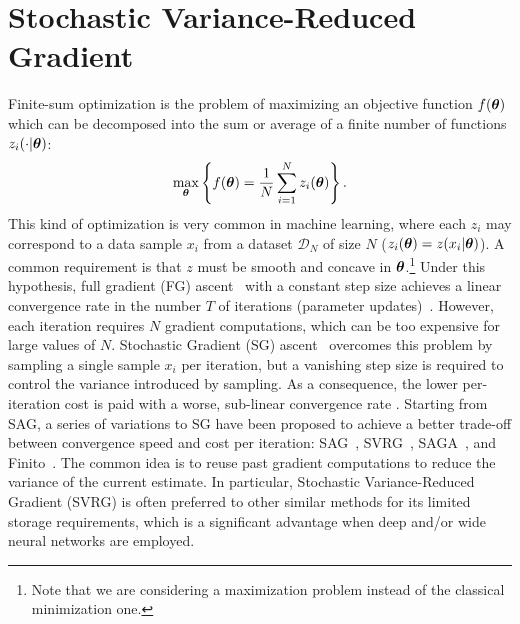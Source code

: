 \section{Stochastic Variance-Reduced Gradient}\label{sec:svrg}
\vspace{-0.05in}
Finite-sum optimization is the problem of maximizing an objective function $f(\boldsymbol{\theta})$ which can be decomposed into the sum or average of a finite number of functions $z_i(\cdot|\boldsymbol{\theta})$:
\begin{align*}
        \max_{\boldsymbol{\theta}} \left\{ f(\boldsymbol{\theta}) = \frac{1}{N}\sum_{i=1}^{N}z_i(\boldsymbol{\theta})\right\}.
\end{align*}
This kind of optimization is very common in machine learning, where each $z_i$ may correspond to a data sample $x_i$ from a dataset $\mathcal{D}_N$ of size $N$ (\ie $z_i(\boldsymbol{\theta}) = z(x_i|\boldsymbol{\theta})$). 
A common requirement is that $z$ must be smooth and concave in $\boldsymbol{\theta}$.\footnote{Note that we are considering a maximization problem instead of the classical minimization one.} 
Under this hypothesis, full gradient (FG) ascent~\citep{cauchy1847methode} with a constant step size achieves a linear convergence rate in the number $T$ of iterations (\ie parameter updates)~\citep{nesterov2013introductory}.
However, each iteration requires $N$ gradient computations, which can be too expensive for large values of $N$. Stochastic Gradient (SG) ascent~\citep[\eg][]{robbins1951stochastic,bottou2004large} overcomes this problem by sampling a single sample $x_i$ per iteration, but a vanishing step size is required to control the variance introduced by sampling. As a consequence, the lower per-iteration cost is paid with a worse, sub-linear convergence rate \cite{nemirovskii1983problem}.
Starting from SAG, a series of variations to SG have been proposed to achieve a better trade-off between convergence speed and cost per iteration: \eg SAG~\citep{roux2012stochastic}, SVRG~\cite{johnson2013accelerating}, SAGA~\cite{defazio2014saga}, and Finito~\cite{defazio2014finito}. 
The common idea is to reuse past gradient computations to reduce the variance of the current estimate.
In particular, Stochastic Variance-Reduced Gradient (SVRG) is often preferred to other similar methods for its limited storage requirements, which is a significant advantage when deep and/or wide neural networks are employed.  

